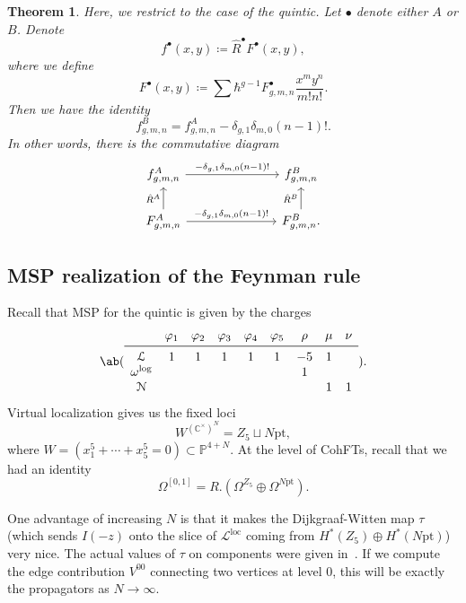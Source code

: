\documentclass[10pt]{amsart}
\newtheorem{thm}{Theorem}[section]
\theoremstyle{definition}
\theoremstyle{remark}
\theoremstyle{plain}
\theoremstyle{definition}
\theoremstyle{remark}
\newcommand{\C}{\mathbb{C}}
\renewcommand{\P}{\mathbb{P}}
\newcommand{\mc}[1]{\mathcal{#1}}
\newcommand{\mr}[1]{\mathrm{#1}}
\newcommand{\on}[1]{\operatorname{#1}}
\newcommand{\1}{\mathbf{1}}
\newcommand{\2}{\mathbf{2}}
\newcommand{\3}{\mathbf{3}}
\newcommand{\pt}{\mr{pt}}
\begin{document}
\begin{thm}
    Here, we restrict to the case of the quintic. Let $\bullet$ denote either $A$ or $B$. Denote
    \[ f^{\bullet}(x,y) \coloneqq \hat{R}^{\bullet} F^{\bullet}(x,y), \]
    where we define
    \[ F^{\bullet}(x,y) \coloneqq \sum \hbar^{g-1} F_{g,m,n}^{\bullet} \frac{x^m y^n}{m! n!}. \]
    Then we have the identity
    \[ f_{g,m,n}^B = f_{g,m,n}^A - \delta_{g,1} \delta_{m,0} (n-1)!. \]
    In other words, there is the commutative diagram
    \begin{equation*}
    \begin{tikzcd}
        f_{g,m,n}^A \ar{rrr}{-\delta_{g,1}\delta_{m,0}(n-1)!} & & & f_{g,m,n}^B \\
        F_{g,m,n}^A \ar{rrr}{-\delta_{g,1} \delta_{m,0}(n-1)!} \ar{u}{\hat{R}^A} & & & F_{g,m,n}^B \ar{u}{\hat{R}^B}.
    \end{tikzcd}
    \end{equation*}
\end{thm}

\subsection{MSP realization of the Feynman rule}%
\label{sub:MSP realization of the Feynman rule}

Recall that MSP for the quintic is given by the charges
\[ \ab(\begin{array}{ccccccccc}
    & \varphi_1 & \varphi_2 & \varphi_3 & \varphi_4 & \varphi_5 & \rho & \mu & \nu \\
    \midrule
    \mc{L} & 1 & 1 & 1 & 1 & 1 & -5 & 1 \\
    \omega^{\log} & & & & & &  1 & &  \\
    \mc{N} & & & & & & & 1 & 1
\end{array}). \]
Virtual localization gives us the fixed loci
\[ W^{(\C^{\times})^N} = Z_5 \sqcup N\pt, \]
where $W = (x_1^5 + \cdots +x_5^5 = 0) \subset \P^{4+N}$. At the level of CohFTs, recall that we had an identity
\[ \Omega^{[0,1]} = R . (\Omega^{Z_5} \oplus \Omega^{N\pt}). \]

One advantage of increasing $N$ is that it makes the Dijkgraaf-Witten map $\tau$ (which sends $I(-z)$ onto the slice of $\mc{L}^{\on{loc}}$ coming from $H^*(Z_5) \oplus H^*(N\pt)$) very nice. The actual values of $\tau$ on components were given in~. If we compute the edge contribution $V^{00}$ connecting two vertices at level $0$, this will be exactly the propagators as $N \to \infty$.
\end{document}

